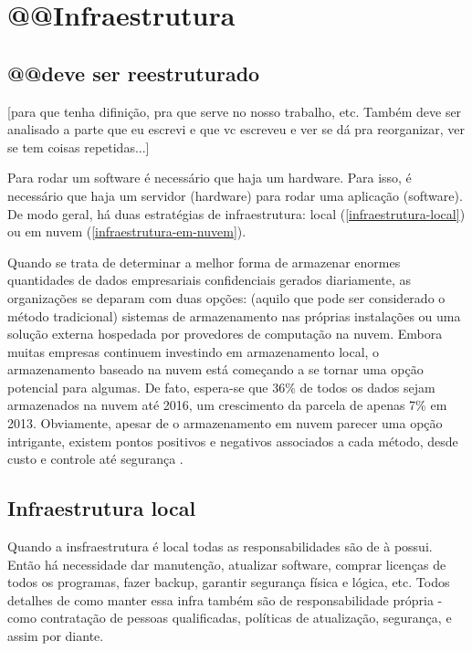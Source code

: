 \chapter{@@Infraestrutura}

\section{@@deve ser reestruturado}
[para que tenha difinição, pra que serve no nosso trabalho, etc.
Também deve ser analisado a parte que eu escrevi e que vc escreveu
e ver se dá pra reorganizar, ver se tem coisas repetidas...]


Para rodar um software é necessário que haja um hardware. Para isso, é necessário
que haja um servidor (hardware) para rodar uma aplicação (software). De modo geral,
há duas estratégias de infraestrutura:
local (\autoref{infraestrutura-local}) ou em nuvem (\autoref{infraestrutura-em-nuvem}).

\begin{citacao}

Quando se trata de determinar a melhor forma de armazenar enormes quantidades de
dados empresariais confidenciais gerados diariamente, as organizações se deparam
com duas opções: (aquilo que pode ser considerado o método tradicional) sistemas
de armazenamento nas próprias instalações ou uma solução externa hospedada por
provedores de computação na nuvem. Embora muitas empresas continuem investindo
em armazenamento local, o armazenamento baseado na nuvem está começando a se
tornar uma opção potencial para algumas. De fato, espera-se que 36\% de todos
os dados sejam armazenados na nuvem até 2016, um crescimento da parcela de
apenas 7\% em 2013. Obviamente, apesar de o armazenamento em nuvem parecer
uma opção intrigante, existem pontos positivos e negativos associados a cada
método, desde custo e controle até segurança \cite{armazenamento-no-local-ou-na-nuvem}.

\end{citacao}

\section{Infraestrutura local}\label{infraestrutura-local}

Quando a insfraestrutura é local todas as responsabilidades são de à possui.
Então há necessidade dar manutenção,
atualizar software, comprar licenças de todos os programas, fazer backup, garantir
segurança física e lógica, etc. Todos detalhes de como manter essa infra
também são de responsabilidade própria - como contratação de pessoas qualificadas,
políticas de atualização, segurança, e assim por diante.

